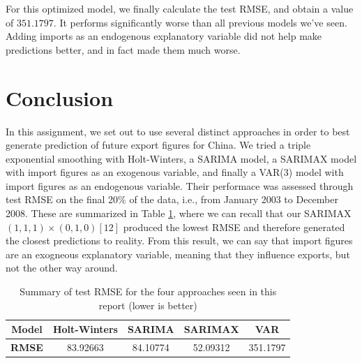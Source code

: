 \documentclass[]{article}
\begin{document}
\begin{table}[!ht]
\centering
{}
\caption{2003 forecast and 95\% confidence interval bands for VAR}
\label{pred_var_tab}
\end{table}

For this optimized model, we finally calculate the test RMSE, and obtain a value of $351.1797$. It performs significantly worse than all previous models we've seen. Adding imports as an endogenous explanatory variable did not help make predictions better, and in fact made them much worse.

\newpage
\section{Conclusion}
In this assignment, we set out to use several distinct approaches in order to best generate prediction of future export figures for China. We tried a triple exponential smoothing with Holt-Winters, a SARIMA model, a SARIMAX model with import figures as an exogenous variable, and finally a VAR(3) model with import figures as an endogenous variable. Their performace was assessed through test RMSE on the final 20\% of the data, i.e., from January 2003 to December 2008. These are summarized in Table \ref{rmse}, where we can recall that our SARIMAX $(1,1,1)\times(0,1,0)[12]$ produced the lowest RMSE and therefore generated the closest predictions to reality. From this result, we can say that import figures are an exogneous explanatory variable, meaning that they influence exports, but not the other way around.

\begin{table}[!ht]
\centering
\begin{tabular}{c|cccc}
\textbf{Model} & Holt-Winters & SARIMA & SARIMAX & VAR\\
\hline
\textbf{RMSE} & 83.92663 & 84.10774 & 52.09312 & 351.1797 \\
\end{tabular}
\caption{Summary of test RMSE for the four approaches seen in this report (lower is better)}
\label{rmse}
\end{table}
\end{document}
